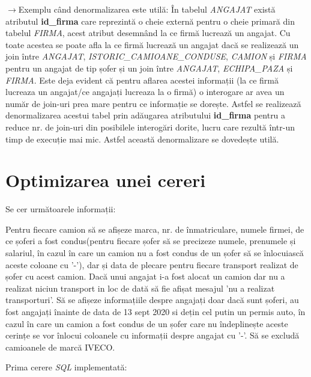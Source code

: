 \documentclass[12pt, a4paper]{article}
\begin{document}
$\rightarrow$Exemplu când denormalizarea este utilă:
În tabelul \emph{ANGAJAT} există atributul \textbf{id\_firma} care reprezintă o cheie externă pentru o cheie primară din tabelul \emph{FIRMA}, acest atribut desemnând la ce firmă lucrează un angajat. Cu toate acestea se poate afla la ce firmă lucrează un angajat dacă se realizează un join între \emph{ANGAJAT}, \emph{ISTORIC\_CAMIOANE\_CONDUSE}, \emph{CAMION} și \emph{FIRMA} pentru un angajat de tip șofer și un join între \emph{ANGAJAT}, \emph{ECHIPA\_PAZA} și \emph{FIRMA}. Este deja evident că pentru aflarea acestei informații (la ce firmă lucreaza un angajat/ce angajați lucreaza la o firmă) o interogare ar avea un număr de join-uri prea mare pentru ce informație se dorește. Astfel se realizează denormalizarea acestui tabel prin adăugarea atributului \textbf{id\_firma} pentru a reduce nr. de join-uri din posibilele interogări dorite, lucru care rezultă într-un timp de execuție mai mic. Astfel această denormalizare se dovedește utilă.

\newpage

\newpage
\section{Optimizarea unei cereri}

Se cer următoarele informații:

Pentru fiecare camion să se afișeze marca, nr. de înmatriculare, numele firmei, de ce șoferi a fost condus(pentru fiecare șofer să se precizeze numele, prenumele și salariul, în cazul în care un camion nu a fost condus de un șofer să se înlocuiască aceste coloane cu '-'), dar și data de plecare pentru fiecare transport realizat de șofer cu acest camion. Dacă unui angajat i-a fost alocat un camion dar nu a realizat niciun transport in loc de dată să fie afișat mesajul 'nu a realizat transporturi'. Să se afișeze informațiile despre angajați doar dacă sunt șoferi, au fost angajați înainte de data de 13 sept 2020 si dețin cel putin un permis auto, în cazul în care un camion a fost condus de un șofer care nu îndeplinește aceste cerințe se vor înlocui coloanele cu informații despre angajat cu '-'. Să se excludă camioanele de marcă IVECO.

Prima cerere \emph{SQL} implementată:
\end{document}
